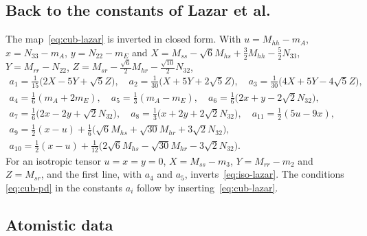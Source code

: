 \subsection{Back to the constants of Lazar et al.}\label{sec:compliance-lazar}

The map~\eqref{eq:cub-lazar} is inverted in closed form. With
$u=M_{hh}-m_A$, $x=N_{33}-m_A$, $y=N_{22}-m_E$ and
$X=M_{ss}-\sqrt6M_{hs}+\tfrac32M_{hh}-\tfrac52N_{33}$, $Y=M_{rr}-N_{22}$,
$Z=M_{sr}-\tfrac{\sqrt6}{2}M_{hr}-\tfrac{\sqrt{10}}{2}N_{32}$,
\begin{equation}
\begin{gathered}
a_1=\tfrac1{15}\big(2X-5Y+\sqrt5Z\big),\quad
a_2=\tfrac1{30}\big(X+5Y+2\sqrt5Z\big),\quad
a_3=\tfrac1{30}\big(4X+5Y-4\sqrt5Z\big),\\
a_4=\tfrac16(m_A+2m_E),\quad a_5=\tfrac13(m_A-m_E),\quad
a_6=\tfrac16\big(2x+y-2\sqrt2N_{32}\big),\\
a_7=\tfrac16\big(2x-2y+\sqrt2N_{32}\big),\quad
a_8=\tfrac13\big(x+2y+2\sqrt2N_{32}\big),\quad
a_{11}=\tfrac12(5u-9x),\\
a_9=\tfrac12(x-u)+\tfrac16\big(\sqrt6M_{hs}+\sqrt{30}M_{hr}+3\sqrt2N_{32}\big),\\
a_{10}=\tfrac12(x-u)+\tfrac1{12}\big(2\sqrt6M_{hs}-\sqrt{30}M_{hr}-3\sqrt2N_{32}\big).
\end{gathered}\label{eq:cub-lazar-inverse}
\end{equation}
For an isotropic tensor $u=x=y=0$, $X=M_{ss}-m_3$, $Y=M_{rr}-m_2$ and $Z=M_{sr}$, and
the first line, with $a_4$ and $a_5$, inverts~\eqref{eq:iso-lazar}. The conditions
\eqref{eq:cub-pd} in the constants $a_i$ follow by inserting~\eqref{eq:cub-lazar}.

\subsection{Atomistic data}\label{sec:compliance-data}

